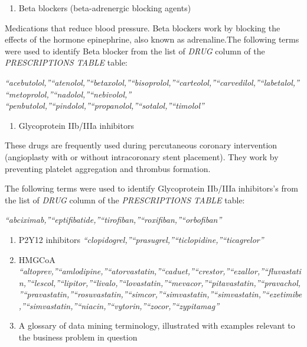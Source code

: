 \documentclass[
]{article}
\providecommand{\tightlist}{%
  \setlength{\itemsep}{0pt}\setlength{\parskip}{0pt}}
\begin{document}
\begin{enumerate}
\def\labelenumi{\arabic{enumi}.}
\setcounter{enumi}{2}
\tightlist
\item
  Beta blockers (beta-adrenergic blocking agents)
\end{enumerate}

Medications that reduce blood pressure. Beta blockers work by blocking
the effects of the hormone epinephrine, also known as adrenaline.The
following terms were used to identify Beta blocker from the list of
\emph{DRUG} column of the \emph{PRESCRIPTIONS TABLE} table:

\emph{``acebutolol,''``atenolol,''``betaxolol,''``bisoprolol,''``carteolol,''``carvedilol,''``labetalol,''``metoprolol,''``nadolol,''``nebivolol,''}
\emph{``penbutolol,''``pindolol,''``propanolol,''``sotalol,''``timolol''}

\begin{enumerate}
\def\labelenumi{\arabic{enumi}.}
\setcounter{enumi}{3}
\tightlist
\item
  Glycoprotein IIb/IIIa inhibitors
\end{enumerate}

These drugs are frequently used during percutaneous coronary
intervention (angioplasty with or without intracoronary stent
placement). They work by preventing platelet aggregation and thrombus
formation.

The following terms were used to identify Glycoprotein IIb/IIIa
inhibitors's from the list of \emph{DRUG} column of the
\emph{PRESCRIPTIONS TABLE} table:

\emph{``abciximab,''``eptifibatide,''``tirofiban,''``roxifiban,''``orbofiban''}

\begin{enumerate}
\def\labelenumi{\arabic{enumi}.}
\setcounter{enumi}{4}
\item
  P2Y12 inhibitors
  \emph{``clopidogrel,''``prasugrel,''``ticlopidine,''``ticagrelor''}
\item
  HMGCoA
  \emph{``altoprev,''``amlodipine,''``atorvastatin,''``caduet,''``crestor,''``ezallor,''``fluvastatin,''``lescol,''``lipitor,''``livalo,''``lovastatin,''``mevacor,''``pitavastatin,''``pravachol,''``pravastatin,''``rosuvastatin,''``simcor,''``simvastatin,''``simvastatin,''``ezetimibe,''``simvastatin,''``niacin,''``vytorin,''``zocor,''``zypitamag''}
\item
  A glossary of data mining terminology, illustrated with examples
  relevant to the business problem in question
\end{enumerate}
\end{document}
